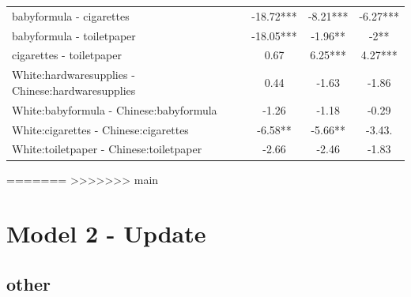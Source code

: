\documentclass[]{report}
\begin{document}
\begin{table}
\begin{tabular}[t]{lccc}
			babyformula - cigarettes & -18.72*** & -8.21*** & -6.27*** \\ 
			babyformula - toiletpaper & -18.05*** & -1.96** & -2** \\ 
			cigarettes - toiletpaper & 0.67 & 6.25*** & 4.27*** \\ 
			White:hardwaresupplies - Chinese:hardwaresupplies & 0.44 & -1.63 & -1.86 \\ 
			White:babyformula - Chinese:babyformula & -1.26 & -1.18 & -0.29 \\ 
			White:cigarettes - Chinese:cigarettes & -6.58** & -5.66** & -3.43. \\ 
			White:toiletpaper - Chinese:toiletpaper & -2.66 & -2.46 & -1.83 \\ 
			\hline
		\end{tabular}
	\end{table}
	
	
	
=======
>>>>>>> main

\chapter{Model 2 - Update}

\section{other}
\end{document}
